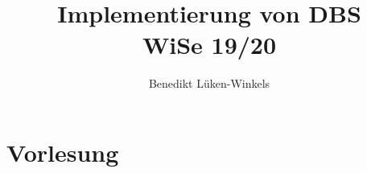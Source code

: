 \documentclass[ngerman]{scrartcl}
\title{Implementierung von DBS \\ WiSe 19/20}
\author{Benedikt Lüken-Winkels}
\begin{document}
\maketitle
\tableofcontents
\newpage


\section{Vorlesung}
\end{document}

